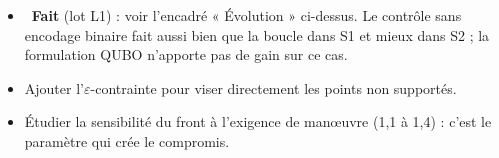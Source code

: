\begin{pistes}
\begin{itemize}
\item {}~\textbf{Fait} (lot L1) : voir l'encadré « Évolution » ci-dessus. Le contrôle sans encodage binaire fait aussi bien que la boucle dans S1 et mieux dans S2 ; la formulation QUBO n'apporte pas de gain sur ce cas.
\item Ajouter l'$\varepsilon$-contrainte pour viser directement les points non supportés.
\item Étudier la sensibilité du front à l'exigence de manœuvre (1,1 à 1,4) : c'est le paramètre qui crée le compromis.
\end{itemize}
\end{pistes}
